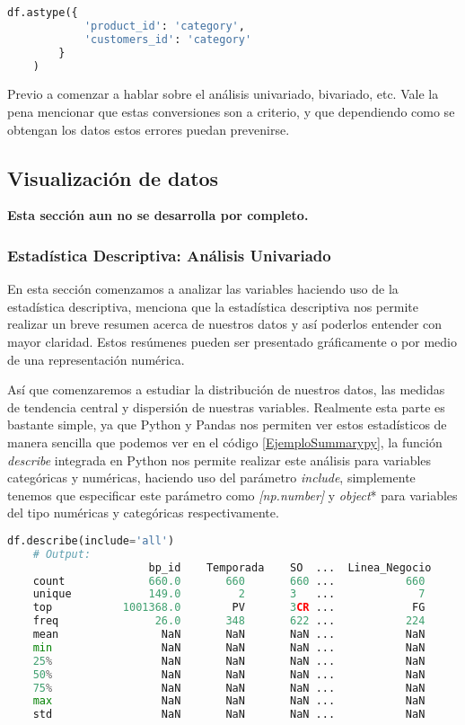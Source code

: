 \begin{lstlisting}[language=Python, caption=Ejemplo de conversión de tipo de datos, label=EjemploFechapy]
	df.astype({
			'product_id': 'category',
			'customers_id': 'category'
		}
	)
\end{lstlisting}

Previo a comenzar a hablar sobre el análisis univariado, bivariado, etc. Vale la pena mencionar que estas conversiones son a criterio, y que dependiendo como se obtengan los datos estos errores puedan prevenirse.

\subsection{Visualización de datos}

\textbf{Esta sección aun no se desarrolla por completo.}

\subsubsection{Estadística Descriptiva: Análisis Univariado}

En esta sección comenzamos a analizar las variables haciendo uso de la estadística descriptiva, \citep{2021KumarUsman} menciona que la estadística descriptiva nos permite realizar un breve resumen acerca de nuestros datos y así poderlos entender con mayor claridad. Estos resúmenes pueden ser presentado gráficamente o por medio de una representación numérica.

Así que comenzaremos a estudiar la distribución de nuestros datos, las medidas de tendencia central y dispersión de nuestras variables. Realmente esta parte es bastante simple, ya que Python y Pandas nos permiten ver estos estadísticos de manera sencilla que podemos ver en el código \ref{EjemploSummarypy}, la función \textit{describe} integrada en Python nos permite realizar este análisis para variables categóricas y numéricas, haciendo uso del parámetro \textit{include}, simplemente tenemos que especificar este parámetro como \textit{[np.number]} y \textit{object}* para variables del tipo numéricas y categóricas respectivamente.

\begin{lstlisting}[language=Python, caption=Ejemplo Summary, label=EjemploSummarypy]
	df.describe(include='all')
	# Output:
	        		  bp_id    Temporada 	SO	...  Linea_Negocio
	count             660.0       660		660	...           660
	unique            149.0         2		3	...             7
	top           1001368.0        PV		3CR	...            FG
	freq               26.0       348		622	...           224
	mean                NaN       NaN		NaN	...           NaN
	min                 NaN       NaN		NaN	...           NaN
	25%                 NaN       NaN		NaN	...           NaN
	50%                 NaN       NaN		NaN	...           NaN
	75%                 NaN       NaN		NaN	...           NaN
	max                 NaN       NaN		NaN	...           NaN
	std                 NaN       NaN		NaN	...           NaN
	
\end{lstlisting}

